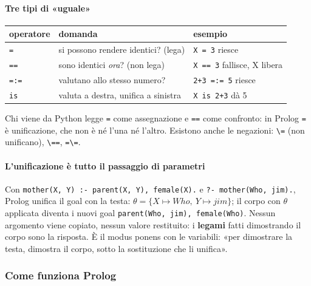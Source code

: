 \documentclass[a4paper,12pt]{article}
\begin{document}
\paragraph{Tre tipi di «uguale»}
\begin{center}
\begin{tabular}{|l|l|l|}
\hline
\textbf{operatore} & \textbf{domanda} & \textbf{esempio} \\
\hline
\texttt{=} & si possono rendere identici? (lega) & \texttt{X = 3} riesce \\
\texttt{==} & sono identici \emph{ora}? (non lega) & \texttt{X == 3} fallisce, X libera \\
\texttt{=:=} & valutano allo stesso numero? & \texttt{2+3 =:= 5} riesce \\
\texttt{is} & valuta a destra, unifica a sinistra & \texttt{X is 2+3} dà 5 \\
\hline
\end{tabular}
\end{center}
Chi viene da Python legge \texttt{=} come assegnazione e \texttt{==} come confronto: in Prolog
\texttt{=} è unificazione, che non è né l'una né l'altro. Esistono anche le negazioni:
\texttt{\textbackslash=} (non unificano), \texttt{\textbackslash==}, \texttt{=\textbackslash=}.

\paragraph{L'unificazione è tutto il passaggio di parametri} Con
\texttt{mother(X, Y) :- parent(X, Y), female(X).} e \texttt{?- mother(Who, jim).}, Prolog unifica
il goal con la testa: $\theta = \{X \mapsto Who,\ Y \mapsto jim\}$; il corpo con $\theta$ applicata
diventa i nuovi goal \texttt{parent(Who, jim), female(Who)}. Nessun argomento viene copiato,
nessun valore restituito: i \textbf{legami} fatti dimostrando il corpo sono la risposta. È il
modus ponens con le variabili: «per dimostrare la testa, dimostra il corpo, sotto la
sostituzione che li unifica».

\subsubsection{Come funziona Prolog}
\end{document}
